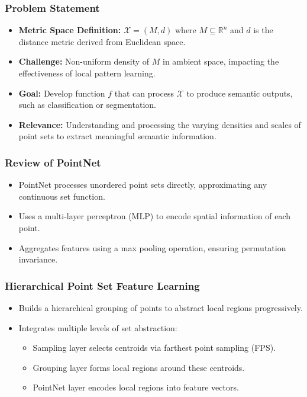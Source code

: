 \documentclass[11pt,xcolor={dvipsnames},hyperref={pdftex,pdfpagemode=UseNone,hidelinks,pdfdisplaydoctitle=true},usepdftitle=false]{beamer}
\begin{document}
\begin{frame}
\frametitle{Problem Statement}
\begin{itemize}
  \item \textbf{Metric Space Definition:} $\mathcal{X}=(M, d)$ where $M \subseteq \mathbb{R}^n$ and $d$ is the distance metric derived from Euclidean space.
  \item \textbf{Challenge:} Non-uniform density of $M$ in ambient space, impacting the effectiveness of local pattern learning.
  \item \textbf{Goal:} Develop function $f$ that can process $\mathcal{X}$ to produce semantic outputs, such as classification or segmentation.
  \item \textbf{Relevance:} Understanding and processing the varying densities and scales of point sets to extract meaningful semantic information.
\end{itemize}
\end{frame}


\begin{frame}
\frametitle{Review of PointNet}
\begin{itemize}
  \item PointNet processes unordered point sets directly, approximating any continuous set function.
  \item Uses a multi-layer perceptron (MLP) to encode spatial information of each point.
  \item Aggregates features using a max pooling operation, ensuring permutation invariance.
\end{itemize}
\end{frame}

\begin{frame}
\frametitle{Hierarchical Point Set Feature Learning}
\begin{itemize}
  \item Builds a hierarchical grouping of points to abstract local regions progressively.
  \item Integrates multiple levels of set abstraction:
  \begin{itemize}
    \item Sampling layer selects centroids via farthest point sampling (FPS).
    \item Grouping layer forms local regions around these centroids.
    \item PointNet layer encodes local regions into feature vectors.
  \end{itemize}
\end{itemize}
\end{frame}
\end{document}
